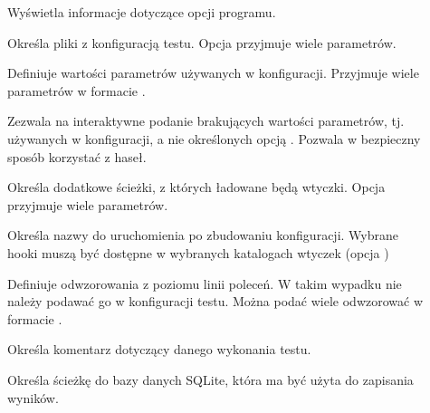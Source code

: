 \documentclass[00-praca-magisterska.tex]{subfiles}
\begin{document}
\begin{description}
\item[]

Wyświetla informacje dotyczące opcji programu.

\item[]

Określa pliki z konfiguracją testu. Opcja przyjmuje wiele parametrów.

\item[]

Definiuje wartości parametrów używanych w konfiguracji. Przyjmuje wiele
parametrów w formacie .

\item[]

Zezwala na interaktywne podanie brakujących wartości parametrów, tj. używanych w
konfiguracji, a nie określonych opcją . Pozwala w bezpieczny sposób
korzystać z haseł. 

\item[]

Określa dodatkowe ścieżki, z których ładowane będą wtyczki. Opcja przyjmuje
wiele parametrów.

\item[]

Określa nazwy  do uruchomienia po zbudowaniu konfiguracji.
Wybrane hooki muszą być dostępne w wybranych katalogach wtyczek (opcja
)

\item[]

Definiuje odwzorowania z poziomu linii poleceń. W takim wypadku nie należy
podawać go w konfiguracji testu. Można podać wiele odwzorować w formacie
.

\item[]

Określa komentarz dotyczący danego wykonania testu.

\item[]

Określa ścieżkę do bazy danych SQLite, która ma być użyta do zapisania wyników.

\end{description}
\end{document}
